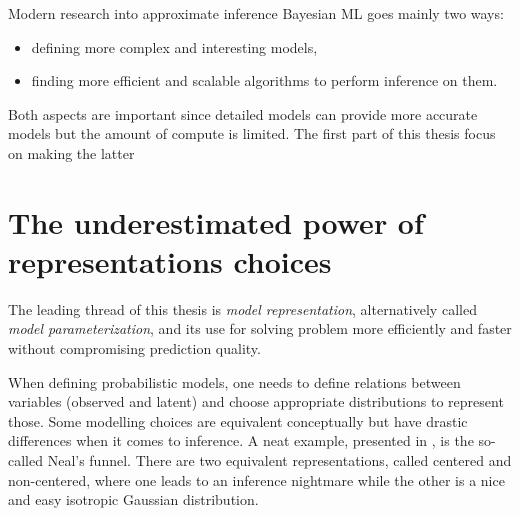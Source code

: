 Modern research into approximate inference Bayesian \ac{ML} goes mainly two ways:
\begin{itemize}
    \item defining more complex and interesting models,
    \item finding more efficient and scalable algorithms to perform inference on them.
\end{itemize}
Both aspects are important since detailed models can provide more accurate models but the amount of compute is limited.
The first part of this thesis focus on making the latter 

\section{The underestimated power of representations choices}

The leading thread of this thesis is \textit{model representation}, alternatively called \textit{model parameterization}, and its use for solving problem more efficiently and faster without compromising prediction quality.

When defining probabilistic models, one needs to define relations between variables (observed and latent) and choose appropriate distributions to represent those.
Some modelling choices are equivalent conceptually but have drastic differences when it comes to inference.
A neat example, presented in \citet{gorinovaAutomaticReparameterisationProbabilistic2020}, is the so-called Neal's funnel.
There are two equivalent representations, called centered and non-centered, where one leads to an inference nightmare while the other is a nice and easy isotropic Gaussian distribution.


